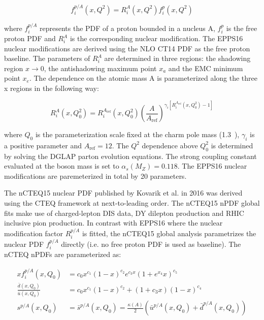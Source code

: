 \begin{equation}
  f_{i}^{p/A}\left(x,Q^{2}\right) = R_{i}^{A}\left(x,Q^{2}\right)f_{i}^{p}\left(x,Q^{2}\right)
\end{equation}

where $f_{i}^{p/A}$ represents the PDF of a proton bounded in a nucleus A, $f_{i}^{p}$ is the free proton PDF and $R_{i}^{A}$ is the corresponding nuclear modification. The EPPS16 nuclear modifications are derived using the NLO CT14 PDF as the free proton baseline. %
The parameters of $R_{i}^{A}$ are determined in three regions: the shadowing region $x\rightarrow0$, the antishadowing maximum point $x_{a}$ and the EMC minimum point $x_{e}$. The dependence on the atomic mass A is parameterized along the three x regions in the following way:

\begin{equation}
  R^{A}_{i}\left(x,Q^{2}_{0}\right) = R^{A_{\mathrm{ref}}}_{i}\left(x,Q^{2}_{0}\right)\left(\frac{A}{A_{\mathrm{ref}}}\right)^{\gamma_{i}\left[R_{i}^{A_{\mathrm{ref}}}\left(x,Q^{2}_{0}\right) - 1\right]}
\end{equation}

where $Q_{0}$ is the parameterization scale fixed at the charm pole mass (1.3~\GeV), $\gamma_{i}$ is a positive parameter and $A_{\mathrm{ref}}=12$. The $Q^{2}$ dependence above $Q^{2}_{0}$ is determined by solving the DGLAP parton evolution equations. The strong coupling constant evaluated at the {\PZ} boson mass is set to $\alpha_{s}\left(M_{Z}\right)=0.118$. The EPPS16 nuclear modifications are paremeterized in total by 20 parameters.

The nCTEQ15 nuclear PDF published by Kovarik et al. in 2016 was derived using the CTEQ framework at next-to-leading order. The nCTEQ15 nPDF global fits make use of charged-lepton DIS data, DY dilepton production and RHIC inclusive pion production. In contrast with EPPS16 where the nuclear modification factor $R_{i}^{p/A}$ is fitted, the nCTEQ15 global analysis parametrizes  the nuclear PDF $f_{i}^{p/A}$ directly (i.e. no free proton PDF is used as baseline). The nCTEQ nPDFs are parameterized as:

\begin{equation}
  \begin{alignedat}{1}
    xf_{i}^{p/A}\left(x,Q_{0}\right) &= c_{0}x^{c_{1}}\left(1-x\right)^{c_{2}}e^{c_{3}x}\left(1+e^{x_{4}}x\right)^{c_{5}} \\
    \frac{\bar{d}\left(x,Q_{0}\right)}{\bar{u}\left(x,Q_{0}\right)} &= c_{0}x^{c_{1}}\left(1-x\right)^{c_{2}} + \left(1+c_{3}x\right)\left(1-x\right)^{c_{4}} \\
    s^{p/A}\left(x,Q_{0}\right) &= \bar{s}^{p/A}\left(x,Q_{0}\right) = \frac{\kappa\left(A\right)}{2}\left(\bar{u}^{p/A}\left(x,Q_{0}\right) + \bar{d}^{p/A}\left(x,Q_{0}\right)\right)
  \end{alignedat}
\end{equation}

